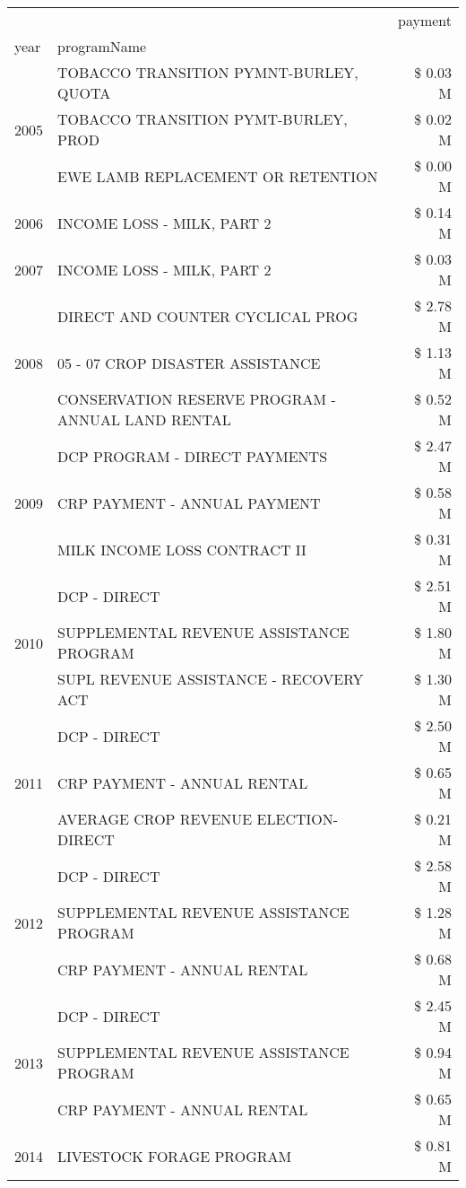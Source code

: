 \begin{tabular}{llr}
\toprule
 &  & payment \\
year & programName &  \\
\midrule
\multirow[t]{3}{*}{2005} & TOBACCO TRANSITION PYMNT-BURLEY, QUOTA & \$ 0.03 M \\
 & TOBACCO TRANSITION PYMT-BURLEY, PROD & \$ 0.02 M \\
 & EWE LAMB REPLACEMENT OR RETENTION & \$ 0.00 M \\
\cline{1-3}
2006 & INCOME LOSS - MILK, PART 2 & \$ 0.14 M \\
\cline{1-3}
2007 & INCOME LOSS - MILK, PART 2 & \$ 0.03 M \\
\cline{1-3}
\multirow[t]{3}{*}{2008} & DIRECT AND COUNTER CYCLICAL PROG & \$ 2.78 M \\
 & 05 - 07 CROP DISASTER ASSISTANCE & \$ 1.13 M \\
 & CONSERVATION RESERVE PROGRAM - ANNUAL LAND RENTAL & \$ 0.52 M \\
\cline{1-3}
\multirow[t]{3}{*}{2009} & DCP PROGRAM - DIRECT PAYMENTS & \$ 2.47 M \\
 & CRP PAYMENT - ANNUAL PAYMENT & \$ 0.58 M \\
 & MILK INCOME LOSS CONTRACT II & \$ 0.31 M \\
\cline{1-3}
\multirow[t]{3}{*}{2010} & DCP - DIRECT & \$ 2.51 M \\
 & SUPPLEMENTAL REVENUE ASSISTANCE PROGRAM & \$ 1.80 M \\
 & SUPL REVENUE ASSISTANCE - RECOVERY ACT & \$ 1.30 M \\
\cline{1-3}
\multirow[t]{3}{*}{2011} & DCP - DIRECT & \$ 2.50 M \\
 & CRP PAYMENT - ANNUAL RENTAL & \$ 0.65 M \\
 & AVERAGE CROP REVENUE ELECTION-DIRECT & \$ 0.21 M \\
\cline{1-3}
\multirow[t]{3}{*}{2012} & DCP - DIRECT & \$ 2.58 M \\
 & SUPPLEMENTAL REVENUE ASSISTANCE PROGRAM & \$ 1.28 M \\
 & CRP PAYMENT - ANNUAL RENTAL & \$ 0.68 M \\
\cline{1-3}
\multirow[t]{3}{*}{2013} & DCP - DIRECT & \$ 2.45 M \\
 & SUPPLEMENTAL REVENUE ASSISTANCE PROGRAM & \$ 0.94 M \\
 & CRP PAYMENT - ANNUAL RENTAL & \$ 0.65 M \\
\cline{1-3}
\multirow[t]{3}{*}{2014} & LIVESTOCK FORAGE PROGRAM & \$ 0.81 M \\

\end{tabular}
